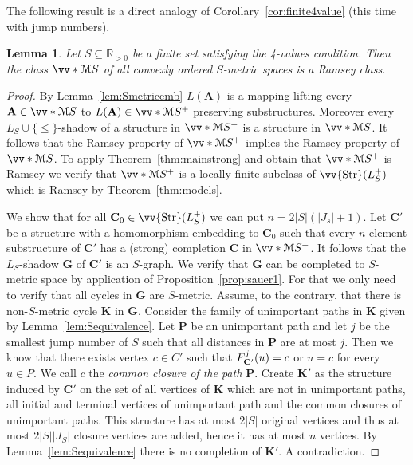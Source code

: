 \documentclass{elsarticle}
\def\Str{\mathop{\mathrm{Str}}\nolimits}
\def\ordclass#1{\vv{#1}}
\def\ordclasssup#1#2{\vv*{#1}{#2}}
\def\str#1{\mathbf {#1}}
\def\nbfunc#1#2{F\ifstrempty{#1}{}{_{#1}}\ifstrempty{#2}{}{^{#2}}}
\theoremstyle{plain}
\newtheorem{lemma}[theorem]{Lemma}
\theoremstyle{definition}
\theoremstyle{remark}
\begin{document}
The following result is a direct analogy of Corollary~\ref{cor:finite4value} (this time with jump numbers).
\begin{lemma}
\label{lem:finite4value2}
Let $S\subseteq \mathbb R_{>0}$ be a finite set satisfying the 4-values
condition.  Then the class
$\ordclasssup{\mathcal M}{S}$ of all convexly ordered $S$-metric spaces  is a Ramsey class.
\end{lemma}
\begin{proof}
By Lemma~\ref{lem:Smetricemb} $L(\str{A})$ is a mapping lifting every $\str{A}\in \ordclasssup{\mathcal M}{S}$ to $L(\str{A})\in \ordclasssup{\mathcal M}{S}^+$ preserving substructures. Moreover every
$L_S\cup\{\leq\}$-shadow of a structure in $\ordclasssup{\mathcal M}{S}^+$ is a structure in  $\ordclasssup{\mathcal M}{S}$.
It follows that the Ramsey property of $\ordclasssup{\mathcal
M}{S}^+$ implies the Ramsey property of $\ordclasssup{\mathcal M}{S}$.
To apply Theorem~\ref{thm:mainstrong} and obtain that $\ordclasssup{\mathcal M}{S}^+$  is Ramsey
we verify
that $\ordclasssup{\mathcal M}{S}^+$ is a locally finite subclass of
$\ordclass{\Str}(L^+_S)$ which is Ramsey by Theorem~\ref{thm:models}.

\medskip

We show that for all $\str{C}_0\in \ordclass{\Str}(L^+_S)$ we can put $n=2\vert S\vert(\vert J_s\vert+1)$.
Let $\str{C}'$ be a structure with a homomorphism-embedding to $\str{C}_0$ such
that every $n$-element substructure of $\str{C}'$ has a (strong) completion $\str{C}$ in $\ordclasssup{\mathcal M}{S}^+$.
It follows that the $L_S$-shadow $\str{G}$ of $\str{C}'$ is an $S$-graph. We verify that 
$\str{G}$ can be completed to $S$-metric space by application of Proposition~\ref{prop:sauer1}.
For that we only need to verify that all cycles in $\str{G}$ are $S$-metric.
Assume, to the contrary, that there is non-$S$-metric cycle $\str{K}$ in $\str{G}$.
 Consider the family of
 unimportant paths in $\str{K}$ given by Lemma~\ref{lem:Sequivalence}. Let $\str{P}$ be an unimportant path and let $j$ be the smallest jump number of $S$ such that all distances in $\str{P}$ are at most $j$.  Then we know that there exists vertex $c\in C'$ such that $\nbfunc{\str{C}'}{j}(u)=c$ or $u=c$ for every $u\in P$. We call $c$ the \emph{common closure of the path $\str{P}$}.
Create $\str{K}'$ as the structure induced by
 $\str{C}'$ on the set of all vertices of $\str{K}$ which are not in unimportant paths, all initial and terminal vertices
 of unimportant path and the common closures of unimportant paths. This structure has at most $2\vert S\vert$ original vertices and thus at most $2\vert S\vert\vert J_S\vert$ closure vertices are added, hence it has at most $n$ vertices. By Lemma~\ref{lem:Sequivalence} there is no completion of $\str{K}'$. A contradiction.


\end{proof}
\end{document}
